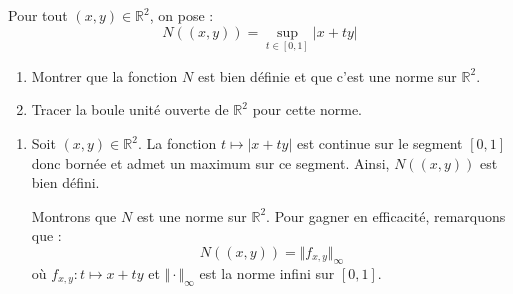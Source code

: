 \documentclass[a4paper,10pt]{report}
\begin{document}
\begin{Exercice}{} Pour tout $(x,y) \in \mathbb{R}^2$, on pose :
$$ N((x,y)) = \sup_{t \in [0,1]} \vert x+ty \vert$$

\begin{enumerate}
\item Montrer que la fonction $N$ est bien définie et que c'est une norme sur $\mathbb{R}^2$.
\item Tracer la boule unité ouverte de $\mathbb{R}^2$ pour cette norme.
\end{enumerate}
\end{Exercice}

\corr 

\begin{enumerate}
\item Soit $(x,y) \in \mathbb{R}^2$. La fonction $t \mapsto \vert x+ty \vert$ est continue sur le segment $[0,1]$ donc bornée et admet un maximum sur ce segment. Ainsi, $N((x,y))$ est bien défini.

\medskip

\noindent Montrons que $N$ est une norme sur $\mathbb{R}^2$. Pour gagner en efficacité, remarquons que :
$$ N((x,y)) = \Vert f_{x,y} \Vert_{\infty}$$
où $f_{x,y} : t \mapsto x+ty$ et $\Vert \cdot \Vert_{\infty}$ est la norme infini sur $[0,1]$.


\end{enumerate}
\end{document}
